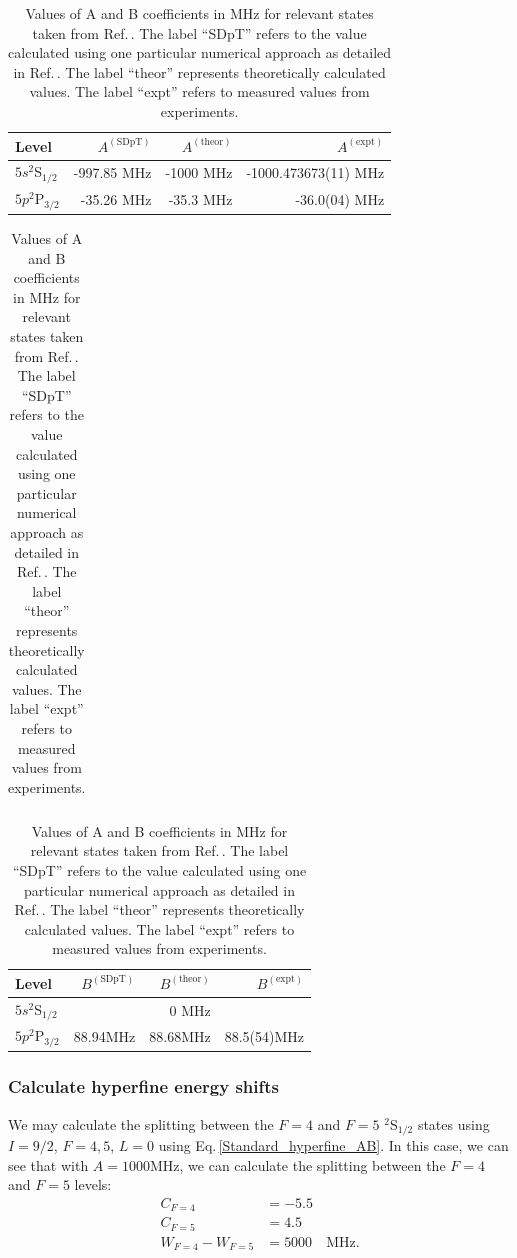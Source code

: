 \begin{table}[h]
\centering
\begin{tabular}{|l|r|r|r|}
\hline
Level &  $A^{\mathrm{(SDpT)}}$ &$A^{\mathrm{(theor)}}$ & $A^{\mathrm{(expt)}}$ \\ \hline \hline
$5s ^2$S$_{1/2}$&-997.85 MHz& -1000 MHz& -1000.473673(11) MHz\\ \hline
$5p ^2$P$_{3/2}$&-35.26 MHz&-35.3 MHz&-36.0(04) MHz\\ \hline
\end{tabular}

\begin{tabular}{l}
\end{tabular}

\begin{tabular}{|l|r|r|r|}
\hline
Level &  $B^{\mathrm{(SDpT)}}$ &$B^{\mathrm{(theor)}}$ & $B^{\mathrm{(expt)}}$ \\ \hline \hline
$5s ^2$S$_{1/2}$&&0  MHz&  \\ \hline
$5p ^2$P$_{3/2}$&88.94MHz&$88.68$MHz\footnotemark&88.5(54)MHz \\ \hline
\end{tabular}
\caption{Values of A and B coefficients in MHz for relevant states taken from Ref.\,\cite{safronova2photon}. The label ``SDpT'' refers to the value calculated using one particular numerical approach as detailed in Ref.\,\cite{safronova2photon}. The label ``theor'' represents theoretically calculated values. The label ``expt'' refers to measured values from experiments.\label{AB_table}
}
\end{table}

\subsubsection{Calculate hyperfine energy shifts}
We may calculate the splitting between the $F=4$ and $F=5$ $^2$S$_{1/2}$ states using $I=9/2$, $F=4,5$, $L=0$ using Eq.\,\ref{Standard_hyperfine_AB}. In this case, we can see that with $A=1000$MHz, we can calculate the splitting between the $F=4$ and $F=5$ levels: 
\begin{align}
C_{F=4} &= -5.5\\
C_{F=5} &= 4.5\\
W_{F=4}-W_{F=5}&=5000 \quad \mathrm{MHz}.
\end{align}

